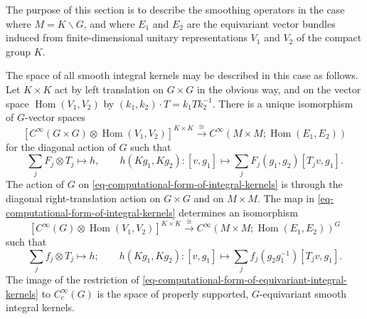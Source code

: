 \documentclass[leqno,11pt]{amsart}
\numberwithin{equation}{subsection}
\theoremstyle{plain}
\theoremstyle{definition}
\theoremstyle{remark}
\DeclareMathOperator{\Hom}{Hom}
\begin{document}
The purpose of this section is to describe the smoothing operators in the case where $M = K \backslash G$, and where $E_1$ and $E_2$ are the equivariant vector bundles induced from finite-dimensional unitary representations $V_1$ and $V_2$ of the compact group $K$.  


The space of all smooth integral kernels may be described in this case as follows. Let    $K{\times} K$ act by left translation on $G{\times }G $ in the obvious way, and on the vector space  $\Hom (V_1,V_2)$ by $(k_1,k_2) \cdot T = k_1 Tk_2^{-1}$. There is a   unique isomorphism of $G$-vector spaces 
\begin{equation}
\label{eq-computational-form-of-integral-kernels}
 [  C^\infty (G{\times} G)\otimes \Hom (V_1,V_2) ]^{K\times K} \stackrel \cong \longrightarrow C^\infty (M{\times} M ; \Hom (E_1,E_2 ))
\end{equation}
for the diagonal action of $G$ such that 
\begin{equation}
\label{eq-fmla-for-integral-kernels}
\sum_j  F_j \otimes T_j   \mapsto h, 
\qquad h (Kg_1,Kg_2)\colon [v,g_1]\mapsto    \sum_j F_j(g_1,g_2)  [T_jv,g_1].
\end{equation} 
The action of $G$ on   \eqref{eq-computational-form-of-integral-kernels} is through the diagonal right-translation action on $G\times G$ and on $M\times M$. The map in \eqref{eq-computational-form-of-integral-kernels} determines an isomorphism 
\begin{equation}
\label{eq-computational-form-of-equivariant-integral-kernels}
 [  C^\infty (G )\otimes \Hom (V_1,V_2) ]^{K\times K} \stackrel \cong \longrightarrow C^\infty (M{\times} M ; \Hom (E_1,E_2 ))^G
\end{equation}
such that 
\begin{equation}
\label{eq-fmla-for-equivariant-integral-kernels}
\sum_j  f_j \otimes T_j   \mapsto h ; 
\qquad h (Kg_1,Kg_2)\colon [v,g_1]\mapsto    \sum_j f_j(g_2g_1^{-1})  [T_jv,g_1].
\end{equation} 
The  image of the restriction of \eqref{eq-computational-form-of-equivariant-integral-kernels} to $C_c^\infty (G)$ is the space of properly supported, $G$-equivariant smooth integral kernels.
\end{document}
